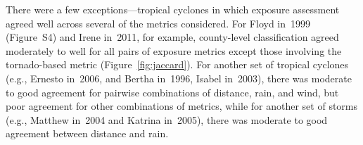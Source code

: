 There were a few exceptions---tropical cyclones in which exposure assessment
agreed well across several of the metrics considered.  For Floyd in~1999
(Figure~S4) and Irene in~2011, for example, county-level classification agreed
moderately to well for all pairs of exposure metrics except those involving the
tornado-based metric (Figure~\ref{fig:jaccard}). For another set of tropical
cyclones (e.g., Ernesto in~2006, and Bertha in~1996, Isabel in~2003), there was
moderate to good agreement for pairwise combinations of distance, rain, and
wind, but poor agreement for other combinations of metrics, while for another
set of storms (e.g., Matthew in~2004 and Katrina in~2005), there was moderate
to good agreement between distance and rain.  



